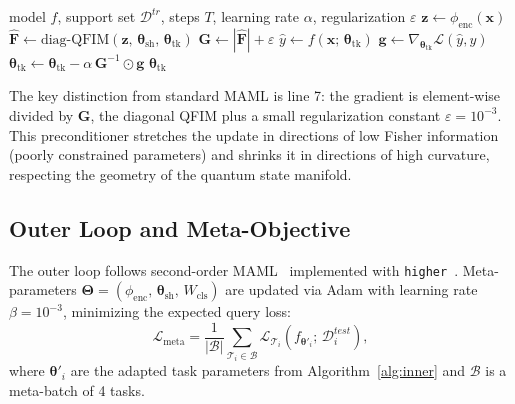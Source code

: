 \documentclass[a4paper,nopdfoutputerror]{quantumarticle}
\begin{document}
\begin{algorithm}[H]
\caption{QMAML Inner Loop (QNG)}
\label{alg:inner}
\begin{algorithmic}[1]
  \Require model $f$, support set $\mathcal{D}^{tr}$, steps $T$,
           learning rate $\alpha$, regularization $\varepsilon$
  \State $\mathbf{z} \gets \phi_{\mathrm{enc}}(\mathbf{x})$
         \quad {}
  \State $\hat{\mathbf{F}} \gets \mathrm{diag\text{-}QFIM}(\mathbf{z},\,
         \boldsymbol{\theta}_{\mathrm{sh}},\, \boldsymbol{\theta}_{\mathrm{tk}})$
         \quad {}
  \State $\mathbf{G} \gets |\hat{\mathbf{F}}| + \varepsilon$
         \quad {}
    \State $\hat{y} \gets f(\mathbf{x};\, \boldsymbol{\theta}_{\mathrm{tk}})$
    \State $\mathbf{g} \gets \nabla_{\boldsymbol{\theta}_{\mathrm{tk}}}
           \mathcal{L}(\hat{y}, y)$
    \State $\boldsymbol{\theta}_{\mathrm{tk}} \gets \boldsymbol{\theta}_{\mathrm{tk}}
           - \alpha\, \mathbf{G}^{-1} \odot \mathbf{g}$
           \quad {}
  \EndFor
  \State \Return $\boldsymbol{\theta}_{\mathrm{tk}}$
\end{algorithmic}
\end{algorithm}

The key distinction from standard MAML is line 7: the gradient is
element-wise divided by $\mathbf{G}$, the diagonal QFIM plus a small
regularization constant $\varepsilon = 10^{-3}$.
This preconditioner stretches the update in directions of low Fisher
information (poorly constrained parameters) and shrinks it in directions of
high curvature, respecting the geometry of the quantum state manifold.

\subsection{Outer Loop and Meta-Objective}

The outer loop follows second-order MAML~\cite{finn2017maml} implemented
with \texttt{higher}~\cite{paszke2019pytorch}.
Meta-parameters $\boldsymbol{\Theta} = (\phi_{\mathrm{enc}},\,
\boldsymbol{\theta}_{\mathrm{sh}},\, W_{\mathrm{cls}})$ are updated via Adam
with learning rate $\beta = 10^{-3}$, minimizing the expected query loss:
\begin{equation}
  \mathcal{L}_{\mathrm{meta}} = \frac{1}{|\mathcal{B}|}
    \sum_{\mathcal{T}_i \in \mathcal{B}}
    \mathcal{L}_{\mathcal{T}_i}\!\left(
      f_{\boldsymbol{\theta}'_i};\, \mathcal{D}_i^{test}
    \right),
\end{equation}
where $\boldsymbol{\theta}'_i$ are the adapted task parameters from
Algorithm~\ref{alg:inner} and $\mathcal{B}$ is a meta-batch of 4 tasks.
\end{document}
